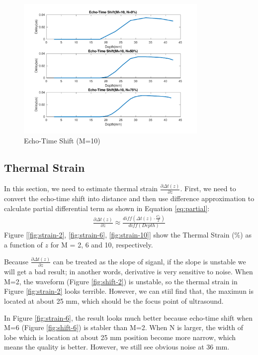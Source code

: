 \documentclass{article}
\begin{document}
\begin{figure}[H]
    \centering
    \includegraphics[width=0.82\textwidth]{src/shift_10.pdf}
    \caption{Echo-Time Shift (M=10)}
    \label{fig:shift-10}
\end{figure}

\subsection{Thermal Strain}
In this section, we need to estimate thermal strain $\frac{\partial \Delta t(z)}{\partial z}$. First, we need to convert the 
echo-time shift into distance and then use difference approximation to calculate partial differential term as shown in 
Equation \ref{eq:partial}:
\begin{align}
    \frac{\partial \Delta t(z)}{\partial z} \approx \frac{diff(\Delta t(z) \cdot \frac{C_0}{2})}{diff(Depth)}
    \label{eq:partial}
\end{align}
Figure [\ref{fig:strain-2}, \ref{fig:strain-6}, \ref{fig:strain-10}] show the Thermal Strain (\%) as a function of $z$ 
for M = 2, 6 and 10, respectively.


Because $\frac{\partial \Delta t(z)}{\partial z}$ can be treated as the slope of siganl, if the slope is unstable we will
get a bad result; in another words, derivative is very sensitive to noise. When M=2, the waveform (Figure \ref{fig:shift-2})
is unstable, so the thermal strain in Figure \ref{fig:strain-2} looks terrible. However, we can stiil find that, the maximun is
located at about 25 mm, which should be the focus point of ultrasound.

In Figure \ref{fig:strain-6}, the result looks much better because echo-time shift when M=6 (Figure \ref{fig:shift-6}) is stabler
than M=2. When N is larger, the width of lobe which is location at about 25 mm position become more narrow, which means the 
quality is better. However, we still see obvious noise at 36 mm.
\end{document}
